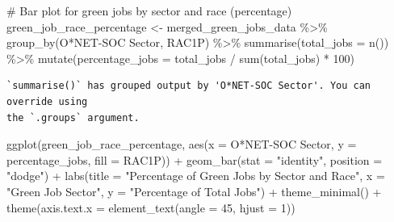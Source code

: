 \documentclass[
  letterpaper,
  DIV=11,
  numbers=noendperiod]{scrartcl}
\newenvironment{Shaded}{\begin{snugshade}}{\end{snugshade}}
\newcommand{\AttributeTok}[1]{\textcolor[rgb]{0.40,0.45,0.13}{#1}}
\newcommand{\CommentTok}[1]{\textcolor[rgb]{0.37,0.37,0.37}{#1}}
\newcommand{\DecValTok}[1]{\textcolor[rgb]{0.68,0.00,0.00}{#1}}
\newcommand{\FunctionTok}[1]{\textcolor[rgb]{0.28,0.35,0.67}{#1}}
\newcommand{\NormalTok}[1]{\textcolor[rgb]{0.00,0.23,0.31}{#1}}
\newcommand{\OtherTok}[1]{\textcolor[rgb]{0.00,0.23,0.31}{#1}}
\newcommand{\SpecialCharTok}[1]{\textcolor[rgb]{0.37,0.37,0.37}{#1}}
\newcommand{\StringTok}[1]{\textcolor[rgb]{0.13,0.47,0.30}{#1}}
\begin{document}
\begin{Shaded}
\begin{Highlighting}[]
\CommentTok{\# Bar plot for green jobs by sector and race (percentage)}
\NormalTok{green\_job\_race\_percentage }\OtherTok{\textless{}{-}}\NormalTok{ merged\_green\_jobs\_data }\SpecialCharTok{\%\textgreater{}\%}
  \FunctionTok{group\_by}\NormalTok{(}\StringTok{\textasciigrave{}}\AttributeTok{O*NET{-}SOC Sector}\StringTok{\textasciigrave{}}\NormalTok{, RAC1P) }\SpecialCharTok{\%\textgreater{}\%}
  \FunctionTok{summarise}\NormalTok{(}\AttributeTok{total\_jobs =} \FunctionTok{n}\NormalTok{()) }\SpecialCharTok{\%\textgreater{}\%}
  \FunctionTok{mutate}\NormalTok{(}\AttributeTok{percentage\_jobs =}\NormalTok{ total\_jobs }\SpecialCharTok{/} \FunctionTok{sum}\NormalTok{(total\_jobs) }\SpecialCharTok{*} \DecValTok{100}\NormalTok{)}
\end{Highlighting}
\end{Shaded}

\begin{verbatim}
`summarise()` has grouped output by 'O*NET-SOC Sector'. You can override using
the `.groups` argument.
\end{verbatim}

\begin{Shaded}
\begin{Highlighting}[]
\FunctionTok{ggplot}\NormalTok{(green\_job\_race\_percentage, }\FunctionTok{aes}\NormalTok{(}\AttributeTok{x =} \StringTok{\textasciigrave{}}\AttributeTok{O*NET{-}SOC Sector}\StringTok{\textasciigrave{}}\NormalTok{, }\AttributeTok{y =}\NormalTok{ percentage\_jobs, }\AttributeTok{fill =}\NormalTok{ RAC1P)) }\SpecialCharTok{+}
  \FunctionTok{geom\_bar}\NormalTok{(}\AttributeTok{stat =} \StringTok{"identity"}\NormalTok{, }\AttributeTok{position =} \StringTok{"dodge"}\NormalTok{) }\SpecialCharTok{+}
  \FunctionTok{labs}\NormalTok{(}\AttributeTok{title =} \StringTok{"Percentage of Green Jobs by Sector and Race"}\NormalTok{,}
       \AttributeTok{x =} \StringTok{"Green Job Sector"}\NormalTok{, }\AttributeTok{y =} \StringTok{"Percentage of Total Jobs"}\NormalTok{) }\SpecialCharTok{+}
  \FunctionTok{theme\_minimal}\NormalTok{() }\SpecialCharTok{+}
  \FunctionTok{theme}\NormalTok{(}\AttributeTok{axis.text.x =} \FunctionTok{element\_text}\NormalTok{(}\AttributeTok{angle =} \DecValTok{45}\NormalTok{, }\AttributeTok{hjust =} \DecValTok{1}\NormalTok{))}
\end{Highlighting}
\end{Shaded}
\end{document}
